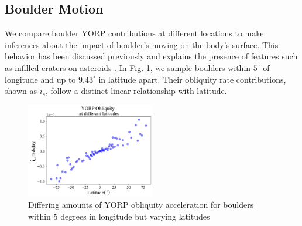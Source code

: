 \subsection{Boulder Motion}
We compare boulder YORP contributions at different locations to make inferences about the impact of boulder's moving on the body's surface. This behavior has been discussed previously and explains the presence of features such as infilled craters on asteroids \citep{Brack2019}. In Fig. \ref{fig:ob_motion_nodelta}, we sample boulders within $5^{\circ}$ of longitude and up to $9.43^{\circ}$ in latitude apart. Their obliquity rate contributions, shown as $\dot{i}_s$, follow a distinct linear relationship with latitude.
\begin{figure}[H]
    \centering
    \includegraphics[width=0.5\textwidth]{fig/obliq_amt_boulder_motion_bennu.png}
    \caption{Differing amounts of YORP obliquity acceleration for boulders within 5 degrees in longitude but varying latitudes}
    \label{fig:ob_motion_nodelta}
\end{figure}

